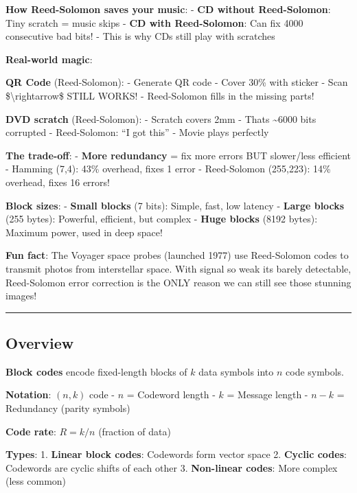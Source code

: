 \textbf{How Reed-Solomon saves your music}: - \textbf{CD without
Reed-Solomon}: Tiny scratch = music skips - \textbf{CD with
Reed-Solomon}: Can fix 4000 consecutive bad bits! - This is why CDs
still play with scratches

\textbf{Real-world magic}:

\textbf{QR Code} (Reed-Solomon): - Generate QR code - Cover 30\% with
sticker - Scan \$\textbackslash rightarrow\$ STILL WORKS! - Reed-Solomon
fills in the missing parts!

\textbf{DVD scratch} (Reed-Solomon): - Scratch covers 2mm -
That\textquotesingle s \textasciitilde6000 bits corrupted -
Reed-Solomon: ``I got this'' - Movie plays perfectly

\textbf{The trade-off}: - \textbf{More redundancy} = fix more errors BUT
slower/less efficient - Hamming (7,4): 43\% overhead, fixes 1 error -
Reed-Solomon (255,223): 14\% overhead, fixes 16 errors!

\textbf{Block sizes}: - \textbf{Small blocks} (7 bits): Simple, fast,
low latency - \textbf{Large blocks} (255 bytes): Powerful, efficient,
but complex - \textbf{Huge blocks} (8192 bytes): Maximum power, used in
deep space!

\textbf{Fun fact}: The Voyager space probes (launched 1977) use
Reed-Solomon codes to transmit photos from interstellar space. With
signal so weak it\textquotesingle s barely detectable, Reed-Solomon
error correction is the ONLY reason we can still see those stunning
images!

\begin{center}\rule{0.5\linewidth}{0.5pt}\end{center}

\subsection{Overview}\label{overview}

\textbf{Block codes} encode fixed-length blocks of \(k\) data symbols
into \(n\) code symbols.

\textbf{Notation}: \((n, k)\) code - \(n\) = Codeword length - \(k\) =
Message length - \(n - k\) = Redundancy (parity symbols)

\textbf{Code rate}: \(R = k/n\) (fraction of data)

\textbf{Types}: 1. \textbf{Linear block codes}: Codewords form vector
space 2. \textbf{Cyclic codes}: Codewords are cyclic shifts of each
other 3. \textbf{Non-linear codes}: More complex (less common)

